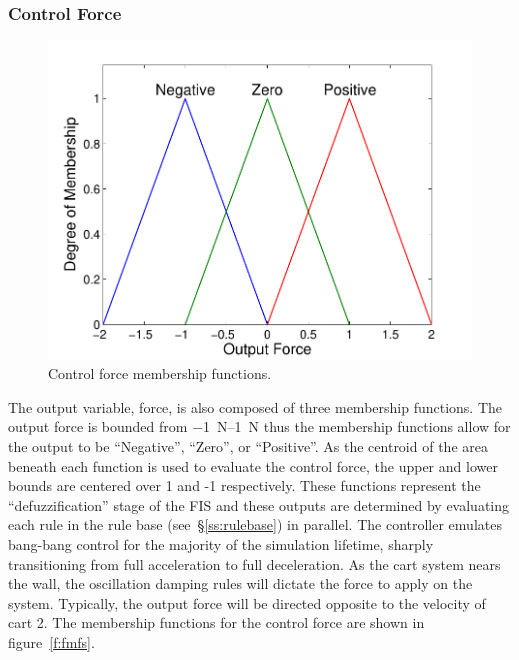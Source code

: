 \documentclass[submit]{aiaa-tc}%
\begin{document}
\subsubsection{Control Force}
\begin{figure}
\includegraphics{f_mfs.pdf}
\caption{Control force membership functions.}
\label{f:fmfs}
\end{figure}
	The output variable, force, is also composed of three membership functions. The output force is bounded from \SIrange{-1}{1}{\newton} thus the membership functions allow for the output to be ``Negative'', ``Zero'', or ``Positive''. As the centroid of the area beneath each function is used to evaluate the control force, the upper and lower bounds are centered over 1 and -1 respectively. These functions represent the ``defuzzification'' stage of the FIS and these outputs are determined by evaluating each rule in the rule base (see~\S\vref{ss:rulebase}) in parallel\cite{matlab:12tb}. The controller emulates bang-bang control for the majority of the simulation lifetime, sharply transitioning from full acceleration to full deceleration. As the cart system nears the wall, the oscillation damping rules will dictate the force to apply on the system. Typically, the output force will be directed opposite to the velocity of cart 2. The membership functions for the control force are shown in figure~\vref{f:fmfs}.
	
	
\end{document}
